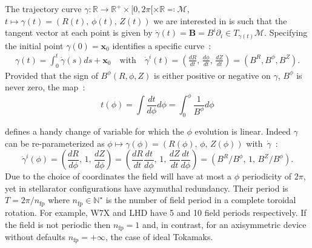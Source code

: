 \noindent
{}

The trajectory curve $\gamma : \mathbb{R}\rightarrow\mathbb{R}^+\times[0,2\pi[\times\mathbb{R} \eqqcolon \mathcal{M}$, $t \mapsto \gamma(t) = (R(t),\,\phi(t),\,Z(t))$ we are interested in is such that the tangent vector at each point is given by $\dot{\gamma}(t)= \textbf{B} = B^i\partial_i \in T_{\gamma(t)}\mathcal{M}$. Specifying the initial point $\gamma(0) = \textbf{x}_0$ identifies a specific curve~:
\begin{align*}
    \gamma(t) = \int_0^t\dot{\gamma}(s)ds + \textbf{x}_0 \quad \text{with} \quad   \dot{\gamma}^i(t)= (\frac{dR}{dt},\,\frac{d\phi}{dt},\,\frac{dZ}{dt}) = (B^R, B^\phi, B^Z).
\end{align*}
Provided that the sign of $B^\phi(R, \phi, Z)$ is either positive or negative on $\gamma$, $B^\phi$ is never zero, the map~:
\begin{equation*}
    t(\phi) = \int \frac{dt}{d\phi}d\phi = \int_0^\phi \frac{1}{B^\phi}d\phi
\end{equation*}

defines a handy change of variable for which the $\phi$ evolution is linear. Indeed $\gamma$ can be re-parameterized as $\phi \mapsto \gamma(\phi) = (R(\phi),\,\phi,\,Z(\phi))$ with~$\dot{\gamma}$~:
\begin{equation*}
    \dot{\gamma}^i(\phi) = (\frac{dR}{d\phi},\,1,\,\frac{dZ}{d\phi}) = (\frac{dR}{dt}\frac{dt}{d\phi},\,1,\,\frac{dZ}{dt}\frac{dt}{d\phi}) = (B^R/B^\phi,\, 1,\,B^Z/B^\phi).
\end{equation*}
Due to the choice of coordinates the field will have at most a $\phi$ periodicity of $2\pi$, yet in stellarator configurations have azymuthal redundancy. Their period is $T = 2\pi/n_\text{fp}$ where $n_\text{fp}\in\mathbb{N}^\star$ is the number of field period in a complete toroidal rotation. For example, W7X and LHD have 5 and 10 field periods respectively. If the field is not periodic then $n_\text{fp} = 1$ and, in contrast, for an axisymmetric device without defaults $n_\text{fp} = +\infty$, the case of ideal Tokamaks.

